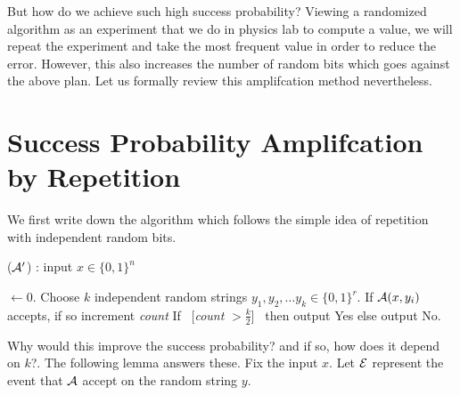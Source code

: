 But how do we achieve such high success probability? Viewing a randomized algorithm as an experiment that we do in physics lab to compute a value, we will repeat the experiment and take the most frequent value in order to reduce the error. However, this also increases the number of random bits which goes against the above plan. Let us formally review this amplifcation method nevertheless.

\section{Success Probability Amplifcation by Repetition}

We first write down the algorithm which follows the simple idea of repetition with independent random bits.

\begin{algorithm}
\label{alg:trivial-amplification}
\caption{(${\cal{A}'}$) : input $x \in \{0,1\}^n$} 
\begin{algorithmic}[1]
 $\gets 0$.
\State Choose $k$ independent random strings $y_1, y_2, \ldots y_k \in \{0,1\}^r$. 
	\State If ${\cal{A}}(x,y_i)$ accepts, if so increment {\em count}
\EndFor
\State If ~[{\em count} $> \frac{k}{2}$]~ then output {\sc Yes} else output {\sc No}.
\end{algorithmic}
\end{algorithm}

Why would this improve the success probability? and if so, how does it depend on $k$?. The following lemma answers these. Fix the input $x$. Let ${\cal{E}}$ represent the event that ${\cal{A}}$ accept on the random string $y$.

